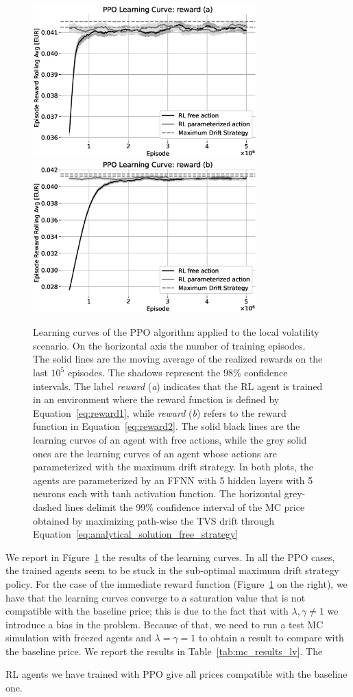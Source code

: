 \documentclass[runningheads]{m2ef}
\newcommand\soutpars[1]{\let\helpcmd\sout\parhelp#1\par\relax\relax}
\newcommand{\change}[1]{{\color{red} {#1}}}%
\newcommand{\remove}[1]{{\color{red} \soutpars{{#1}}}}%
\begin{document}
\begin{figure}[h!]
	\centering
	\includegraphics[width=3.4in]{LV_PPO_reward_a_learning_curve.eps}
	\includegraphics[width=3.4in]{LV_PPO_reward_b_learning_curve.eps}
	\caption{Learning curves of the PPO algorithm applied to the local volatility \change{scenario}. On the horizontal axis the number of training episodes. The solid lines are the moving average of the realized rewards on the last $10^5$ episodes. The shadows represent the $98\%$ confidence intervals. The label {\it reward} ({\it a}) indicates that the RL agent is trained in an environment where the reward function is defined by Equation~\eqref{eq:reward1}, while {\it reward} ({\it b}) refers to the reward function in Equation~\eqref{eq:reward2}. The solid black lines are the learning curves of an agent with free actions, while the grey solid ones are the learning curves of an agent whose actions are parameterized with the maximum drift strategy. In both plots, the agents are parameterized by an FFNN with 5 hidden layers with 5 neurons each with tanh activation function. The horizontal grey-dashed lines delimit the 99\% confidence interval of the MC price obtained by maximizing path-wise the TVS drift through Equation~\eqref{eq:analytical_solution_free_strategy}}\label{fig:PPO_results}
\end{figure}
We report in Figure~\ref{fig:PPO_results} the results of the learning curves. In all the PPO cases, the trained agents seem to be stuck in the sub-optimal maximum drift strategy policy. For the case of the immediate reward function (Figure~\ref{fig:PPO_results} on the right), we have that the learning curves converge to a saturation value that is not compatible with the baseline price; this is due to the fact that with $\lambda,\gamma \neq 1$ we introduce a bias in the problem. Because of that, we need to run a test MC simulation with freezed agents and $\lambda=\gamma=1$ to obtain a result to compare with the baseline price. We report the results in Table~\ref{tab:mc_results_lv}. The \remove{Reinforcement Learning} \change{RL} agents we have trained with PPO give all prices compatible with the baseline one.
\end{document}

